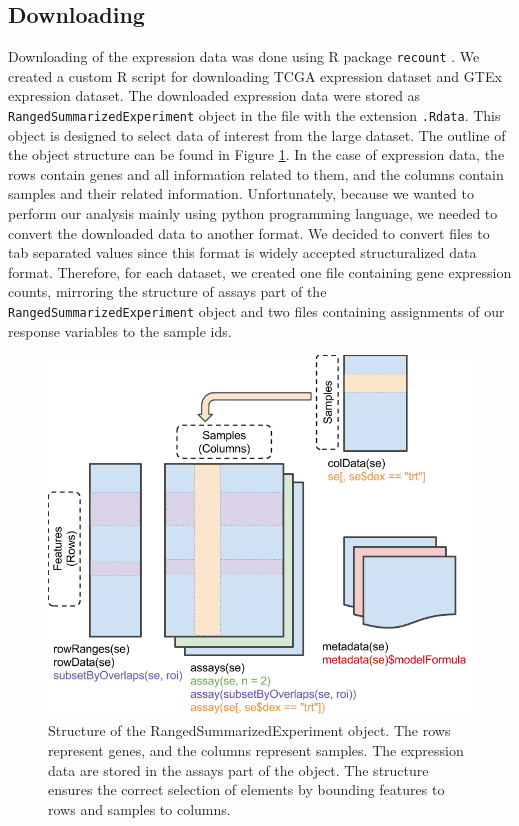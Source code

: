 \subsection{Downloading}
Downloading of the expression data was done using R package \verb'recount' \cite{collado2017reproducible}.
We created a custom R script for downloading TCGA expression dataset and GTEx expression dataset.
The downloaded expression data were stored as \verb'RangedSummarizedExperiment' object in the file with the extension \verb'.Rdata'.
This object is designed to select data of interest from the large dataset.
The outline of the object structure can be found in Figure \ref{fig:sre}.
In the case of expression data, the rows contain genes and all information related to them, and the columns contain samples and their related information.
Unfortunately, because we wanted to perform our analysis mainly using python programming language, we needed to convert the downloaded data to another format.
We decided to convert files to tab separated values since this format is widely accepted structuralized data format.
Therefore, for each dataset, we created one file containing gene expression counts, mirroring the structure of assays part of the \verb'RangedSummarizedExperiment' object and two files containing assignments of our response variables to the sample ids.

\begin{figure}
    \centering
    \includegraphics[width=0.8\linewidth]{images/SummarizedExperiment.png}
    \caption{Structure of the RangedSummarizedExperiment object. The rows represent genes, and the columns represent samples. The expression data are stored in the assays part of the object. The structure ensures the correct selection of elements by bounding features to rows and samples to columns.}
    \label{fig:sre}
\end{figure}

